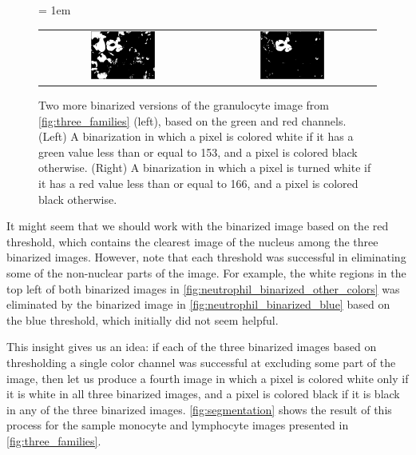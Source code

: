 \begin{figure}[h]
\centering
 \tabcolsep = 1em
\mySfFamily
\begin{tabular}{c c}
\includegraphics[width = 0.4\textwidth]{../images/neutrophil_binarized_green.png} & \includegraphics[width = 0.4\textwidth]{../images/neutrophil_binarized_red.png}
\end{tabular}
\caption{Two more binarized versions of the granulocyte image from \autoref{fig:three_families} (left), based on the green and red channels.  (Left) A binarization in which a pixel is colored white if it has a green value less than or equal to 153, and a pixel is colored black otherwise. (Right) A binarization in which a pixel is turned white if it has a red value less than or equal to 166, and a pixel is colored black otherwise.}
\label{fig:neutrophil_binarized_other_colors}
\end{figure}

It might seem that we should work with the binarized image based on the red threshold, which contains the clearest image of the nucleus among the three binarized images. However, note that each threshold was successful in eliminating some of the non-nuclear parts of the image. For example, the white regions in the top left of both binarized images in \autoref{fig:neutrophil_binarized_other_colors} was eliminated by the binarized image in \autoref{fig:neutrophil_binarized_blue} based on the blue threshold, which initially did not seem helpful.

This insight gives us an idea: if each of the three binarized images based on thresholding a single color channel was successful at excluding some part of the image, then let us produce a fourth image in which a pixel is colored white only if it is white in all three binarized images, and a pixel is colored black if it is black in any of the three binarized images. \autoref{fig:segmentation} shows the result of this process for the sample monocyte and lymphocyte images presented in \autoref{fig:three_families}. \\

